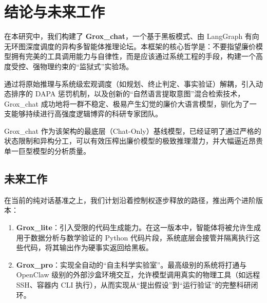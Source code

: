 \section{结论与未来工作}
\label{sec:conclusion}

在本研究中，我们构建了 \textbf{Grox\_chat}，一个基于黑板模式、由 LangGraph 有向无环图深度调度的异构多智能体推理论坛。本框架的核心哲学是：不要指望廉价模型拥有完美的工具调用能力与自律性，而是应该通过系统工程的手段，构建一个高度受控、强物理约束的“监狱式”实验场。

通过将原始推理与系统级宏观调度（如规划、终止判定、事实验证）解耦，引入动态排序的 DAPA 惩罚机制，以及创新的“自然语言提取意图”混合检索技术，Grox\_chat 成功地将一群不稳定、极易产生幻觉的廉价大语言模型，驯化为了一支能够持续进行高强度逻辑博弈的科研专家团队。

Grox\_chat 作为该架构的最底层（Chat-Only）基线模型，已经证明了通过严格的状态限制和异构分工，可以有效压榨出廉价模型的极致推理潜力，并大幅逼近昂贵单一巨型模型的分析质量。

\subsection{未来工作}
在当前的纯对话基准之上，我们计划沿着控制权逐步释放的路径，推出两个进阶版本：
\begin{enumerate}
    \item \textbf{Grox\_lite}：引入受限的代码生成能力。在这一版本中，智能体将被允许生成用于数据分析与数学验证的 Python 代码片段，系统底层会接管并隔离执行这些代码，将其输出作为硬事实返回给黑板。
    \item \textbf{Grox\_pro}：实现全自动的“自主科学实验室”。最高级别的系统将打通与 OpenClaw 级别的外部沙盒环境交互，允许模型调用真实的物理工具（如远程 SSH、容器内 CLI 执行），从而实现从“提出假设”到“运行验证”的完整科研闭环。
\end{enumerate}